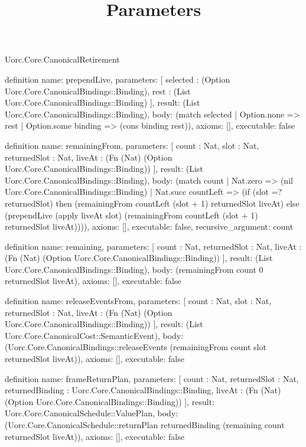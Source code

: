 \begin{lexlean}{Uorc.Core.CanonicalRetirement}
\title{Parameters}
\begin{semanticmodule}
definition{
  name: prependLive,
  parameters: [
    selected : (Option Uorc.Core.CanonicalBindings::Binding),
    rest : (List Uorc.Core.CanonicalBindings::Binding)
  ],
  result: (List Uorc.Core.CanonicalBindings::Binding),
  body: (match selected | Option.none => rest | Option.some binding => (cons binding rest)),
  axioms: [],
  executable: false
}

definition{
  name: remainingFrom,
  parameters: [
    count : Nat,
    slot : Nat,
    returnedSlot : Nat,
    liveAt : (Fn (Nat) (Option Uorc.Core.CanonicalBindings::Binding))
  ],
  result: (List Uorc.Core.CanonicalBindings::Binding),
  body: (match count
    | Nat.zero => (nil Uorc.Core.CanonicalBindings::Binding)
    | Nat.succ countLeft => (if (slot =? returnedSlot) then (remainingFrom countLeft (slot + 1) returnedSlot liveAt) else (prependLive (apply liveAt slot) (remainingFrom countLeft (slot + 1) returnedSlot liveAt)))),
  axioms: [],
  executable: false,
  recursive_argument: count
}

definition{
  name: remaining,
  parameters: [
    count : Nat,
    returnedSlot : Nat,
    liveAt : (Fn (Nat) (Option Uorc.Core.CanonicalBindings::Binding))
  ],
  result: (List Uorc.Core.CanonicalBindings::Binding),
  body: (remainingFrom count 0 returnedSlot liveAt),
  axioms: [],
  executable: false
}

definition{
  name: releaseEventsFrom,
  parameters: [
    count : Nat,
    slot : Nat,
    returnedSlot : Nat,
    liveAt : (Fn (Nat) (Option Uorc.Core.CanonicalBindings::Binding))
  ],
  result: (List Uorc.Core.CanonicalCost::SemanticEvent),
  body: (Uorc.Core.CanonicalBindings::releaseEvents (remainingFrom count slot returnedSlot liveAt)),
  axioms: [],
  executable: false
}

definition{
  name: frameReturnPlan,
  parameters: [
    count : Nat,
    returnedSlot : Nat,
    returnedBinding : Uorc.Core.CanonicalBindings::Binding,
    liveAt : (Fn (Nat) (Option Uorc.Core.CanonicalBindings::Binding))
  ],
  result: Uorc.Core.CanonicalSchedule::ValuePlan,
  body: (Uorc.Core.CanonicalSchedule::returnPlan returnedBinding (remaining count returnedSlot liveAt)),
  axioms: [],
  executable: false
}


\end{semanticmodule}
\end{lexlean}
